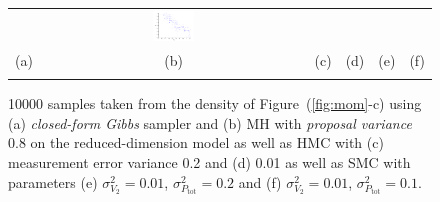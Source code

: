 \documentclass[letterpaper]{article}
\newcommand{\nn}{0.16}
\begin{document}
\begin{figure}[t!]
\begin{center}
\begin{tabular}{cccccc}
& \hspace{-3mm} \includegraphics[width=\nn\textwidth]{../Figs2/col_c_ang_10000_01_001}
\vspace{-1.5mm}
\\
   \hspace{-4mm} \footnotesize(a) 
& \hspace{-2mm} \footnotesize(b) 
& \hspace{-3mm} \footnotesize(c) 
&\hspace{-1mm} \footnotesize(d) 
&\hspace{-1mm} \footnotesize(e) 
&\hspace{-1mm} \footnotesize(f)\\
\multicolumn{6}{c}{}
\end{tabular}
\end{center}
\vspace{-8mm}
\caption{\footnotesize
10000 samples taken from the density of Figure~(\ref{fig:mom}-c)
using (a) \emph{closed-form  Gibbs} sampler and (b) MH with \emph{proposal variance} 0.8 
on the reduced-dimension model as well as  
HMC with (c) measurement error variance 0.2 and (d) 0.01 as well as SMC with  
parameters (e)
$\sigma^2_{V_2} = 0.01$, $\sigma^2_{P_\text{tot}} = 0.2$ and 
(f) $\sigma^2_{V_2} = 0.01$, $\sigma^2_{P_\text{tot}} = 0.1$.
}
\label{fig:mom2}
\vspace{-4mm}
\end{figure}
\end{document}
